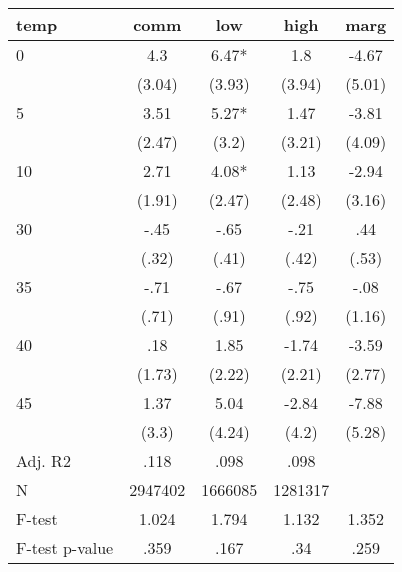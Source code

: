 \documentclass[]{article}
\begin{document}
\begin{tabular}{lcccc} \hline
temp & comm & low & high & marg \\ \hline
0 & 4.3 & 6.47* & 1.8 & -4.67 \\
 & (3.04) & (3.93) & (3.94) & (5.01) \\
5 & 3.51 & 5.27* & 1.47 & -3.81 \\
 & (2.47) & (3.2) & (3.21) & (4.09) \\
10 & 2.71 & 4.08* & 1.13 & -2.94 \\
 & (1.91) & (2.47) & (2.48) & (3.16) \\
30 & -.45 & -.65 & -.21 & .44 \\
 & (.32) & (.41) & (.42) & (.53) \\
35 & -.71 & -.67 & -.75 & -.08 \\
 & (.71) & (.91) & (.92) & (1.16) \\
40 & .18 & 1.85 & -1.74 & -3.59 \\
 & (1.73) & (2.22) & (2.21) & (2.77) \\
45 & 1.37 & 5.04 & -2.84 & -7.88 \\
 & (3.3) & (4.24) & (4.2) & (5.28) \\
\hline Adj. R2 & .118 & .098 & .098 &  \\
N & 2947402 & 1666085 & 1281317 &  \\
F-test & 1.024 & 1.794 & 1.132 & 1.352 \\
 F-test p-value & .359 & .167 & .34 & .259 \\ \hline
\end{tabular}
\end{document}
